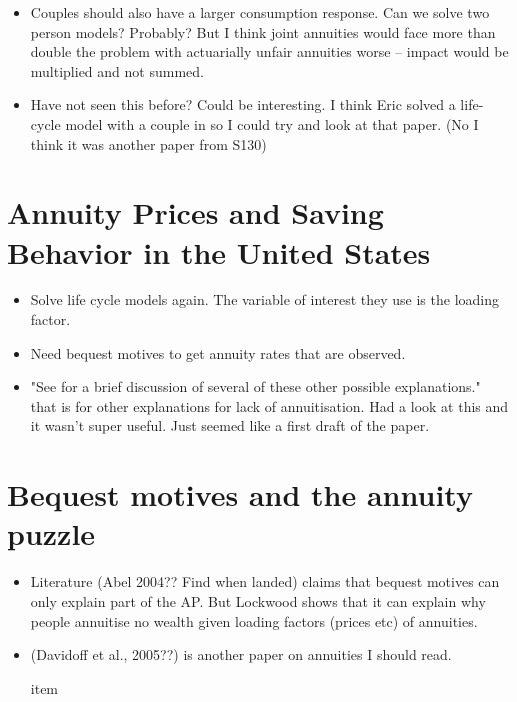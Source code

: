 \documentclass[12pt]{article}
\begin{document}
\begin{itemize}
  \item Couples should also have a larger consumption response. Can we solve
        two person models? Probably? But I think joint annuities would face
        more than double the problem with actuarially unfair annuities worse --
        impact would be multiplied and not summed.

  \item Have not seen this before? Could be interesting. I think Eric solved a life-cycle model
        with a couple in so I could try and look at that paper. (No I think it was another paper from S130)

\end{itemize}

\section{Annuity Prices and Saving Behavior in the United States}
\begin{itemize}
  \item Solve life cycle models again. The variable of interest they use is the
        loading factor.

  \item Need bequest motives to get annuity rates that are observed.
  \item "See \cite{friedman_warshawsky_nber_1985} for a brief discussion of several
        of these other possible explanations." that is for other explanations for
        lack of annuitisation. Had a look at this and it wasn't super useful. Just
        seemed like a first draft of the paper.



\end{itemize}


\section{Bequest motives and the annuity puzzle}
\begin{itemize}
  \item Literature (Abel 2004?? Find when landed) claims that bequest motives
        can only explain part of the AP. But Lockwood shows that it can explain why people
        annuitise no wealth given loading factors (prices etc) of annuities.

  \item  (Davidoff et al., 2005??) is another paper on annuities I should read.

        item
\end{itemize}
\end{document}
